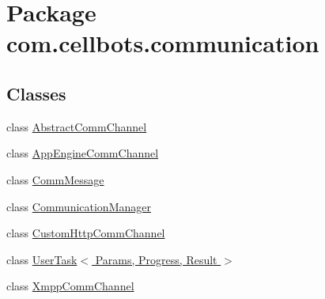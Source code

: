 \hypertarget{namespacecom_1_1cellbots_1_1communication}{\section{Package com.\-cellbots.\-communication}
\label{namespacecom_1_1cellbots_1_1communication}
}
\subsection*{Classes}
\begin{DoxyCompactItemize}
\item 
class \hyperlink{classcom_1_1cellbots_1_1communication_1_1_abstract_comm_channel}{Abstract\-Comm\-Channel}
\item 
class \hyperlink{classcom_1_1cellbots_1_1communication_1_1_app_engine_comm_channel}{App\-Engine\-Comm\-Channel}
\item 
class \hyperlink{classcom_1_1cellbots_1_1communication_1_1_comm_message}{Comm\-Message}
\item 
class \hyperlink{classcom_1_1cellbots_1_1communication_1_1_communication_manager}{Communication\-Manager}
\item 
class \hyperlink{classcom_1_1cellbots_1_1communication_1_1_custom_http_comm_channel}{Custom\-Http\-Comm\-Channel}
\item 
class \hyperlink{classcom_1_1cellbots_1_1communication_1_1_user_task_3_01_params_00_01_progress_00_01_result_01_4}{User\-Task$<$ Params, Progress, Result $>$}
\item 
class \hyperlink{classcom_1_1cellbots_1_1communication_1_1_xmpp_comm_channel}{Xmpp\-Comm\-Channel}
\end{DoxyCompactItemize}
